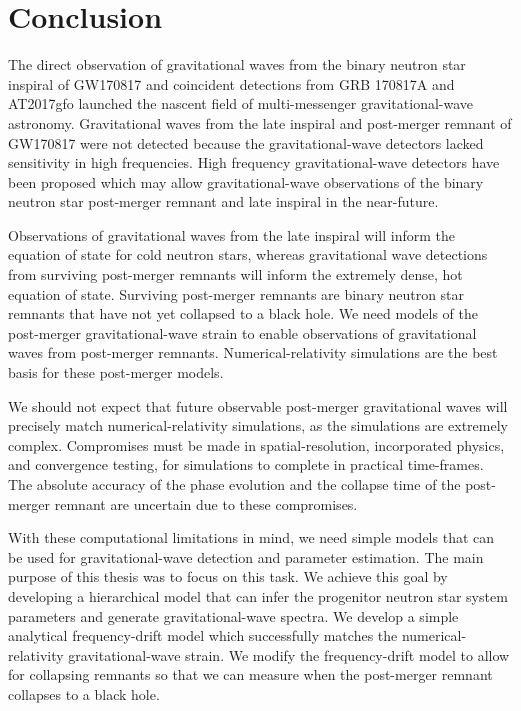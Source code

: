 \documentclass[../Thesis.tex]{subfiles}
\begin{document}
\chapter{Conclusion}\label{chapter:Conclusion}
    The direct observation of gravitational waves from the binary neutron star inspiral of GW170817 and coincident detections from GRB 170817A and AT2017gfo launched the nascent field of multi-messenger gravitational-wave astronomy.
    Gravitational waves from the late inspiral and post-merger remnant of GW170817 were not detected because the gravitational-wave detectors lacked sensitivity in high frequencies.
    High frequency gravitational-wave detectors have been proposed  which may allow gravitational-wave observations of the binary neutron star post-merger remnant and late inspiral in the near-future. \par
    
    Observations of gravitational waves from the late inspiral will inform the equation of state for cold neutron stars, whereas gravitational wave detections from surviving post-merger remnants will inform the extremely dense, hot equation of state.
    Surviving post-merger remnants are binary neutron star remnants that have not yet collapsed to a black hole.
    We need models of the post-merger gravitational-wave strain to enable observations of gravitational waves from post-merger remnants.
    Numerical-relativity simulations are the best basis for these post-merger models. \par
    
    We should not expect that future observable post-merger gravitational waves will precisely match numerical-relativity simulations, as the simulations are extremely complex.
    Compromises must be made in spatial-resolution, incorporated physics, and convergence testing, for simulations to complete in practical time-frames.
    The absolute accuracy of the phase evolution and the collapse time of the post-merger remnant are uncertain due to these compromises.\par
    
    With these computational limitations in mind, we need simple models that can be used for gravitational-wave detection and parameter estimation.
    The main purpose of this thesis was to focus on this task.
    We achieve this goal by developing a hierarchical model that can infer the progenitor neutron star system parameters and generate gravitational-wave spectra.
    We develop a simple analytical frequency-drift model which successfully matches the numerical-relativity gravitational-wave strain. 
    We modify the frequency-drift model to allow for collapsing remnants so that we can measure when the post-merger remnant collapses to a black hole.
    
\end{document}
